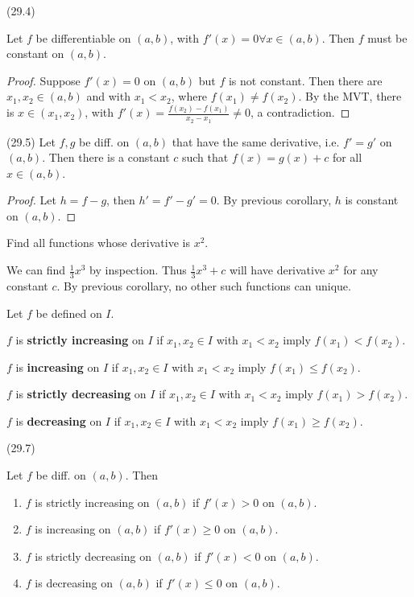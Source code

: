 \documentclass{article}
\begin{document}
\begin{corollary}
    (29.4)

    Let $f$ be differentiable on $(a, b)$, with $f'(x) = 0 \forall x \in (a, b)$. Then $f$ must be constant on $(a, b)$.
\end{corollary}
\begin{proof}
    Suppose $f'(x) = 0$ on $(a, b)$ but $f$ is not constant. Then there are $x_1, x_2 \in (a, b)$ and with $x_1 < x_2$, where $f(x_1) \neq f(x_2)$. By the MVT, there is $x \in (x_1, x_2)$, with $f'(x) = \frac{f(x_2) - f(x_1)}{x_2 - x_1} \neq 0$, a contradiction.
\end{proof}
\begin{corollary}
    (29.5)
    Let $f, g$ be diff. on $(a, b)$ that have the same derivative, i.e. $f' = g'$ on $(a, b)$. Then there is a constant $c$ such that $f(x) = g(x) + c$ for all $x \in (a, b)$. 
\end{corollary}
\begin{proof}
    Let $h = f-g$, then $h' = f' - g' = 0$. By previous corollary, $h$ is constant on $(a, b)$.
\end{proof}
\begin{example}
    Find all functions whose derivative is $x^2$.

    We can find $\frac{1}{3}x^3$ by inspection. Thus $\frac{1}{3}x^3 + c$ will have derivative $x^2$ for any constant $c$. By previous corollary, no other such functions can unique.
\end{example}
\begin{definition}
    Let $f$ be defined on $I$. 
    
    $f$ is \textbf{strictly increasing} on $I$ if $x_1, x_2 \in I$ with $x_1 < x_2$ imply $f(x_1) < f(x_2)$.

    $f$ is \textbf{increasing} on $I$ if $x_1, x_2 \in I$ with $x_1 < x_2$ imply $f(x_1) \leq f(x_2)$.
    
    $f$ is \textbf{strictly decreasing} on $I$ if $x_1, x_2 \in I$ with $x_1 < x_2$ imply $f(x_1) > f(x_2)$.

    $f$ is \textbf{decreasing} on $I$ if $x_1, x_2 \in I$ with $x_1 < x_2$ imply $f(x_1) \geq f(x_2)$.
\end{definition}
\begin{corollary}
    (29.7)

    Let $f$ be diff. on $(a, b)$. Then 
    \begin{enumerate}
        \item $f$ is strictly increasing on $(a, b)$ if $f'(x) > 0$ on $(a, b)$.
        \item $f$ is increasing on $(a, b)$ if $f'(x) \geq 0$ on $(a, b)$.
        \item $f$ is strictly decreasing on $(a, b)$ if $f'(x) < 0$ on $(a, b)$.
        \item $f$ is decreasing on $(a, b)$ if $f'(x) \leq 0$ on $(a, b)$.
    \end{enumerate}
\end{corollary}
\end{document}
